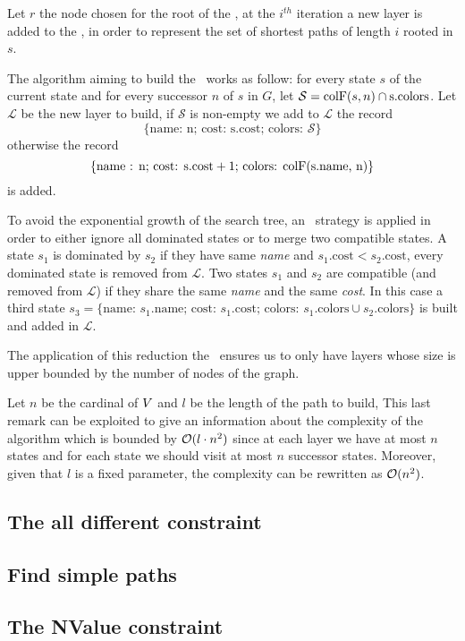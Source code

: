 Let $r$ the node chosen for the root of the \mdd, at the $i^{th}$ iteration a new layer is added to the \mdd, in order to represent the set of shortest paths of length $i$ rooted in $s$.

The algorithm aiming to build the \mdd\ works as follow: for every state $s$ of the current state and for every successor $n$ of $s$ in $G$, let $\mathcal{S} = \text{colF}(s, n) \cap \text{s.colors}$. Let $\mathcal{L}$ be the new layer to build, if $\mathcal{S}$ is non-empty we add to $\mathcal{L}$ the record
$$\{\text{name: n; cost: s.cost; colors: } \mathcal{S}\}$$ otherwise the record
$$\{\text{name : n; cost: s.cost} + 1 \text{; colors: \text{colF}(s.name, n)}\}$$ is added.

To avoid the exponential growth of the search tree, an \adhoc\ strategy is applied in order to either ignore all dominated states or to merge two compatible states. A state $s_1$ is dominated by $s_2$ if they have same \textit{name} and $s_1.\text{cost} < s_2.\text{cost}$, every dominated state is removed from $\mathcal{L}$. Two states $s_1$ and $s_2$ are compatible (and removed from $\mathcal{L}$) if they share the same \textit{name} and the same \textit{cost}. In this case a third state $s_3 = \{\text{name: } s_1.\text{name; cost: } s_1.\text{cost; colors: } s_1.\text{colors} \cup s_2.\text{colors}\}$ is built and added in $\mathcal{L}$.

The application of this reduction the \mdd\ ensures us to only have layers whose size is upper bounded by the number of nodes of the graph.

Let $n$ be the cardinal of $V$ and $l$ be the length of the path to build, This last remark can be exploited to give an information about the complexity of the algorithm which is bounded by $\mathcal{O}(l \cdot n^2)$ since at each layer we have at most $n$ states and for each state we should visit at most $n$ successor states. Moreover, given that $l$ is a fixed parameter, the complexity can be rewritten as $\mathcal{O}(n^2)$.


\subsection{The all different constraint}


\subsection{Find simple paths}


\subsection{The NValue constraint}